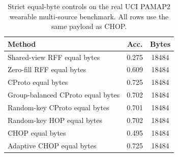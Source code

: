 \begin{table}[t]
\centering
\caption{Strict equal-byte controls on the real UCI PAMAP2 wearable multi-source benchmark. All rows use the same payload as CHOP.}
\label{tab:strict-equal-byte-pamap2}
\begin{tabular}{lcc}
\toprule
Method & Acc. & Bytes \\
\midrule
Shared-view RFF equal bytes & 0.275 & 18484 \\
Zero-fill RFF equal bytes & 0.609 & 18484 \\
CProto equal bytes & 0.725 & 18484 \\
Group-balanced CProto equal bytes & 0.702 & 18484 \\
Random-key CProto equal bytes & 0.701 & 18484 \\
Random-key HOP equal bytes & 0.702 & 18484 \\
CHOP equal bytes & 0.495 & 18484 \\
Adaptive CHOP equal bytes & 0.725 & 18484 \\
\bottomrule
\end{tabular}
\end{table}
